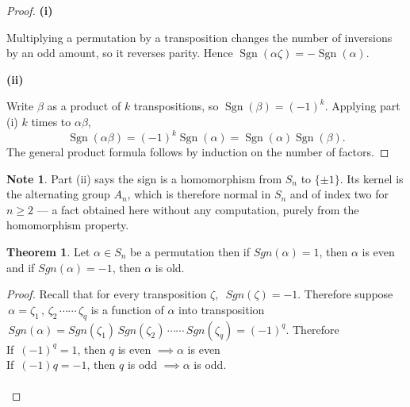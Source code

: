 \documentclass[11pt,a4paper]{article}
\theoremstyle{definition}
\newtheorem{thm}{Theorem}[subsection]
\newtheorem*{note}{Note}
\newcommand{\subhead}[1]{%
  \par\medskip\noindent\textbf{#1}\par\nobreak\smallskip}
\begin{document}
\begin{proof}
\subhead{(i)}
Multiplying a permutation by a transposition changes the number of inversions by
an odd amount, so it reverses parity. Hence
$\operatorname{Sgn}(\alpha\zeta) = -\operatorname{Sgn}(\alpha)$.

\subhead{(ii)}
Write $\beta$ as a product of $k$ transpositions, so
$\operatorname{Sgn}(\beta) = (-1)^{k}$. Applying part (i) $k$ times to
$\alpha\beta$,
$$\operatorname{Sgn}(\alpha\beta) = (-1)^{k}\operatorname{Sgn}(\alpha)
= \operatorname{Sgn}(\alpha)\operatorname{Sgn}(\beta).$$
The general product formula follows by induction on the number of factors.
\end{proof}

\begin{note}
Part (ii) says the sign is a homomorphism from $S_n$ to $\{\pm1\}$. Its kernel is
the alternating group $A_n$, which is therefore normal in $S_n$ and of index two
for $n\geq2$ --- a fact obtained here without any computation, purely from the
homomorphism property.
\end{note}






\begin{thm}
Let $\alpha\in S_n$ be a permutation then if $Sgn(\alpha) = 1$, then $\alpha$ is even and if $Sgn(\alpha)  = -1$, then $\alpha$  is old.\\
\end{thm}

\begin{proof}
Recall that for every transposition $\zeta$, $\,\, Sgn(\zeta)  = -1$. Therefore suppose $\, \alpha = \zeta_1\, , \, \zeta_2\, \cdots\cdots\, \zeta_q$ is a function of $\alpha$ into transposition $\, Sgn(\alpha) = Sgn(\zeta_1)\,Sgn(\zeta_2)\,\cdots\cdots\, Sgn(\zeta_q) = (-1)^q$. Therefore\\
If $\, (-1)^q = 1$, then $q$ is even $\implies \alpha$ is even\\
If $\, (-1)q = -1$, then $q$ is odd $\implies \alpha$ is odd.\\\\
\end{proof}
\end{document}
